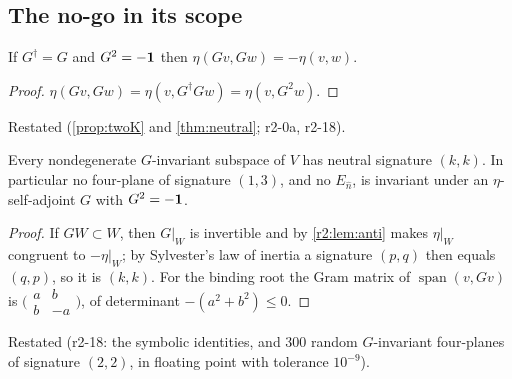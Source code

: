 \subsection{The no-go in its scope}
\label{r2:sec:nogo}

\begin{lemma}
\label{r2:lem:anti}
If $G^\dagger=G$ and $G^2=-\mathbf 1$ then $\eta(Gv,Gw)=-\eta(v,w)$.
\end{lemma}

\begin{proof}
$\eta(Gv,Gw)=\eta(v,G^\dagger Gw)=\eta(v,G^2w)$.
\end{proof}

Restated (\cref{prop:twoK} and \cref{thm:neutral}; r2-0a, r2-18).

\begin{proposition}
\label{r2:prop:nogo}
Every nondegenerate $G$-invariant subspace of $V$ has neutral signature $(k,k)$. In particular no four-plane of signature $(1,3)$, and no $E_{\hat n}$, is
invariant under an $\eta$-self-adjoint $G$ with $G^2=-\mathbf 1$.
\end{proposition}

\begin{proof}
If $GW\subset W$, then $G|_W$ is invertible and by \cref{r2:lem:anti} makes $\eta|_W$ congruent to $-\eta|_W$; by Sylvester's law of inertia
\cite{ONeill83} a signature $(p,q)$ then equals $(q,p)$, so it is $(k,k)$. For the binding root the Gram matrix of $\operatorname{span}(v,Gv)$ is
$\bigl(\begin{smallmatrix}a&b\\b&-a\end{smallmatrix}\bigr)$, of determinant $-(a^2+b^2)\le0$.
\end{proof}

Restated (r2-18: the symbolic identities, and 300 random $G$-invariant four-planes of signature $(2,2)$, in floating point
with tolerance $10^{-9}$).

